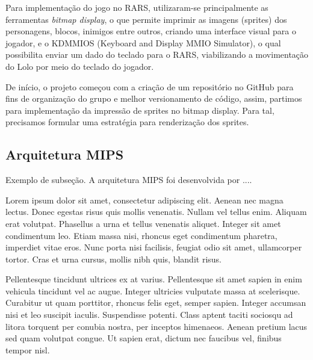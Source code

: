 \documentclass[10pt, conference, compsocconf]{IEEEtran}
\begin{document}
Para implementação do jogo no RARS, utilizaram-se principalmente as ferramentas
\textit{bitmap display}, o que permite imprimir as imagens (sprites) dos personagens,
blocos, inimigos entre outros, criando uma interface visual para o jogador, e o
KDMMIOS (Keyboard and Display MMIO Simulator), o qual possibilita enviar um dado
do teclado para o RARS, viabilizando a movimentação do Lolo por meio do teclado
do jogador.

De início, o projeto começou com a criação de um repositório no GitHub para fins
de organização do grupo e melhor versionamento de código, assim, partimos para
implementação da impressão de sprites no bitmap display. Para tal, precisamos
formular uma estratégia para renderização dos sprites.

\subsection{Arquitetura MIPS}{
\label{sec:MIPS}
Exemplo de subseção. A arquitetura MIPS \cite{patterson2005organizaccao} foi desenvolvida por ....


Lorem ipsum dolor sit amet, consectetur adipiscing elit. Aenean nec magna lectus. Donec egestas risus quis mollis venenatis. Nullam vel tellus enim. Aliquam erat volutpat. Phasellus a urna et tellus venenatis aliquet. Integer sit amet condimentum leo. Etiam massa nisi, rhoncus eget condimentum pharetra, imperdiet vitae eros. Nunc porta nisi facilisis, feugiat odio sit amet, ullamcorper tortor. Cras et urna cursus, mollis nibh quis, blandit risus.

Pellentesque tincidunt ultrices ex at varius. Pellentesque sit amet sapien in enim vehicula tincidunt vel ac augue. Integer ultricies vulputate massa at scelerisque. Curabitur ut quam porttitor, rhoncus felis eget, semper sapien. Integer accumsan nisi et leo suscipit iaculis. Suspendisse potenti. Class aptent taciti sociosqu ad litora torquent per conubia nostra, per inceptos himenaeos. Aenean pretium lacus sed quam volutpat congue. Ut sapien erat, dictum nec faucibus vel, finibus tempor nisl. 
}
\end{document}
